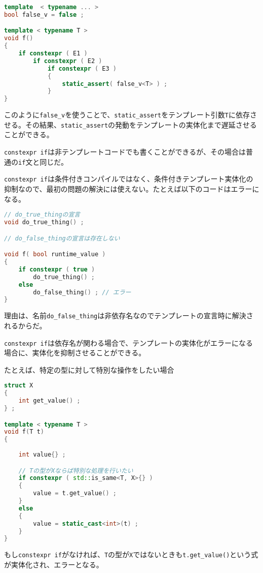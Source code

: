 \begin{lstlisting}[language=C++]
template  < typename ... >
bool false_v = false ;

template < typename T >
void f()
{
    if constexpr ( E1 )
        if constexpr ( E2 )
            if constexpr ( E3 )
            {
                static_assert( false_v<T> ) ;
            }
}
\end{lstlisting}

このように\lstinline!false_v!を使うことで、\lstinline!static_assert!をテンプレート引数\lstinline!T!に依存させる。その結果、\lstinline!static_assert!の発動をテンプレートの実体化まで遅延させることができる。

\lstinline!constexpr if!は非テンプレートコードでも書くことができるが、その場合は普通の\lstinline!if!文と同じだ。

%

\lstinline!constexpr if!は条件付きコンパイルではなく、条件付きテンプレート実体化の抑制なので、最初の問題の解決には使えない。たとえば以下のコードはエラーになる。

\begin{lstlisting}[language=C++]
// do_true_thingの宣言
void do_true_thing() ;

// do_false_thingの宣言は存在しない

void f( bool runtime_value )
{
    if constexpr ( true )
        do_true_thing() ;
    else
        do_false_thing() ; // エラー
}
\end{lstlisting}

理由は、名前\lstinline!do_false_thing!は非依存名なのでテンプレートの宣言時に解決されるからだ。

%

\lstinline!constexpr if!は依存名が関わる場合で、テンプレートの実体化がエラーになる場合に、実体化を抑制させることができる。

たとえば、特定の型に対して特別な操作をしたい場合
\begin{lstlisting}[language=C++]
struct X
{
    int get_value() ;
} ;

template < typename T >
void f(T t)
{
    
    int value{} ;

    // Tの型がXならば特別な処理を行いたい
    if constexpr ( std::is_same<T, X>{} )
    {
        value = t.get_value() ;
    }
    else
    {
        value = static_cast<int>(t) ;
    }
}
\end{lstlisting}
もし\lstinline!constexpr if!がなければ、\lstinline!T!の型が\lstinline!X!ではないときも\lstinline!t.get_value()!という式が実体化され、エラーとなる。

